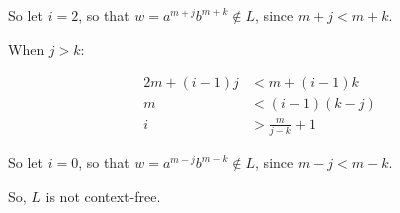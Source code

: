 \documentclass[paper=a4, fontsize=11pt]{scrartcl} %
\begin{document}
\begin{enumerate}
  So let $i=2$, so that $w = a^{m+j}b^{m+k} \not\in L$, since $m+j<m+k$.

  When $j>k$:

  \begin{equation}
    \begin{split}
      2m+(i-1)j &< m+(i-1)k\\
      m &< (i-1)(k-j)\\
      i &> \frac{m}{j-k}+1
    \end{split}
  \end{equation}

  So let $i=0$, so that $w = a^{m-j}b^{m-k} \not\in L$, since $m-j<m-k$.

  So, $L$ is not context-free.

\end{enumerate}

\pagebreak
\end{document}
